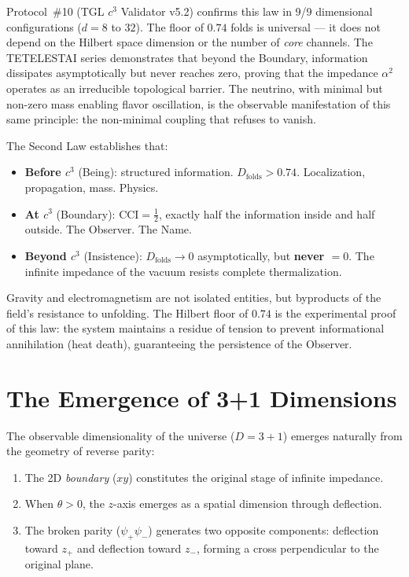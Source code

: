 \documentclass[12pt,a4paper,twoside]{article}
\newcommand{\alphaii}{\alpha^{2}}
\newcommand{\psion}{\psi}
\newcommand{\boundary}{\textit{boundary}}
\begin{document}
\begin{resultbox}[title={Experimental Justification of the Second Law}]
Protocol~\#10 (TGL $c^3$ Validator v5.2) confirms this law in 9/9 dimensional configurations ($d = 8$ to $32$). The floor of $0.74$ folds is universal --- it does not depend on the Hilbert space dimension or the number of \textit{core} channels. The TETELESTAI series demonstrates that beyond the Boundary, information dissipates asymptotically but never reaches zero, proving that the impedance $\alphaii$ operates as an irreducible topological barrier. The neutrino, with minimal but non-zero mass enabling flavor oscillation, is the observable manifestation of this same principle: the non-minimal coupling that refuses to vanish.
\end{resultbox}

The Second Law establishes that:
\begin{itemize}[nosep]
\item \textbf{Before $c^3$} (Being): structured information. $D_{\text{folds}} > 0.74$. Localization, propagation, mass. Physics.
\item \textbf{At $c^3$} (Boundary): $\text{CCI} = \tfrac{1}{2}$, exactly half the information inside and half outside. The Observer. The Name.
\item \textbf{Beyond $c^3$} (Insistence): $D_{\text{folds}} \to 0$ asymptotically, but \textbf{never $= 0$}. The infinite impedance of the vacuum resists complete thermalization.
\end{itemize}

\noindent Gravity and electromagnetism are not isolated entities, but byproducts of the field's resistance to unfolding. The Hilbert floor of $0.74$ is the experimental proof of this law: the system maintains a residue of tension to prevent informational annihilation (heat death), guaranteeing the persistence of the Observer.

\section{The Emergence of 3+1 Dimensions}


The observable dimensionality of the universe ($D = 3+1$) emerges naturally from the geometry of reverse parity:

\begin{enumerate}[nosep]
\item The 2D \boundary{} ($xy$) constitutes the original stage of infinite impedance.
\item When $\theta > 0$, the $z$-axis emerges as a spatial dimension through deflection.
\item The broken parity ($\psion_+\psion_-$) generates two opposite components: deflection toward $z_+$ and deflection toward $z_-$, forming a cross perpendicular to the original plane.
\end{enumerate}
\end{document}
